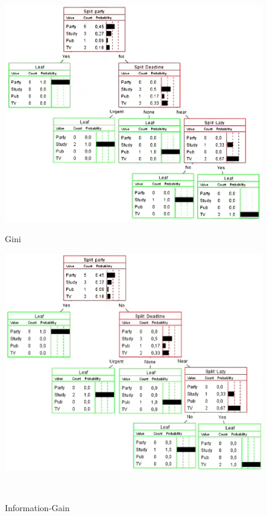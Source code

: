 \documentclass[a4paper,parskip=full-]{article}
\begin{document}
\begin{figure}[H]
   \centering
	\begin{minipage}[b]{0.45\textwidth}
  		\centering
		\includegraphics[width=\columnwidth]{3c-Gini}
		\label{fig:3c-gini}
		\caption{Gini}
	\end{minipage}
	\hfill
	\begin{minipage}[b]{0.45\textwidth}
  		\centering
		\includegraphics[width=\columnwidth]{3c-Information-Gain} 
		\caption{Information-Gain}
	\end{minipage} \\

\end{figure}
\end{document}
